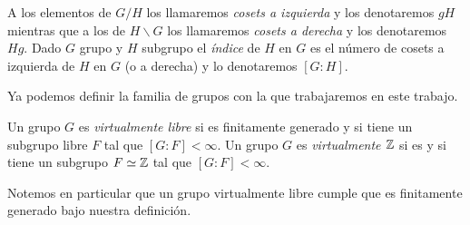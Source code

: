 \documentclass[tesis.tex]{subfiles}
\begin{document}
A los elementos de $G/H$ los llamaremos \emph{cosets a izquierda} y los denotaremos $gH$ mientras que a los de $H \backslash G$ los llamaremos \emph{cosets a derecha} y los denotaremos $Hg$.
Dado $G$ grupo y $H$ subgrupo el \emph{índice} de $H$ en $G$ es el número de cosets a izquierda de $H$ en $G$ (o a derecha) y lo denotaremos $[G:H]$.


Ya podemos definir la familia de grupos con la que trabajaremos en este trabajo.

\begin{deff}
	Un grupo $G$ es \emph{virtualmente libre} si es finitamente generado y si
	tiene un subgrupo libre $F$ tal que $[G:F] < \infty$.
	Un grupo $G$ es \emph{virtualmente $\mathbb{Z}$} si es \fg y si tiene un subgrupo $F \simeq \mathbb{Z}$ tal que $[G:F] < \infty$. 
\end{deff}

Notemos en particular que un grupo virtualmente libre cumple que es finitamente generado bajo nuestra definición.
\end{document}
